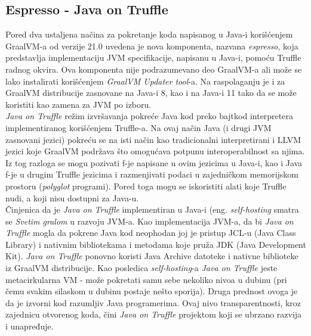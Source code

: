 \documentclass[a4paper]{article}
\begin{document}
\subsection{Espresso - Java on Truffle}
\label{sub:Espresso - Java on Truffle}

Pored dva ustaljena načina za pokretanje koda napisanog u Java-i korišćenjem GraalVM-a od verzije 21.0 uvedena je nova komponenta, nazvana \emph{espresso}, koja predstavlja implementaciju JVM specifikacije, napisanu u Java-i, pomoću Truffle radnog okvira. Ova komponenta nije podrazumevano deo GraalVM-a ali može se lako instalirati korišćenjem \emph{GraalVM Updater tool}-a. Na raspolaganju je i za GraalVM distribucije zasnovane na Java-i 8, kao i na Java-i 11 tako da se može koristiti kao zamena za JVM po izboru. \\


\emph{Java on Truffle} režim izvršavanja pokreće Java kod preko bajtkod interpretera implementiranog korišćenjem Truffle-a. Na ovaj način Java (i drugi JVM zasnovani jezici) pokreću se na isti način kao tradicionalni interpretirani i LLVM jezici koje GraalVM podržava što omogućava potpunu interoperabilnost sa njima. Iz tog razloga se mogu pozivati f-je napisane u ovim jezicima u Java-i, kao i Java f-je u drugim Truffle jezicima i razmenjivati podaci u zajedničkom memorijskom prostoru (\emph{polyglot} programi). Pored toga mogu se iskoristiti alati koje Truffle nudi, a koji nisu dostupni za Java-u. \\

Činjenica da je \emph{Java on Truffle} implementiran u Java-i (eng. \emph{self-hosting} smatra se \emph{Svetim gralom} u razvoju JVM-a. Kao implementacija JVM-a, da bi \emph{Java on Truffle} mogla da pokrene Java kod neophodan joj je pristup JCL-u (Java Class Library) i nativnim bibliotekama i metodama koje pruža JDK (Java Development Kit). \emph{Java on Truffle} ponovno koristi Java Archive datoteke i nativne biblioteke iz GraalVM distribucije. Kao posledica \emph{self-hosting}-a \emph{Java on Truffle} jeste metacirkularna VM - može pokretati samu sebe nekoliko nivoa u dubinu (pri čemu svakim silaskom u dubinu postaje nešto sporija). Druga prednost ovoga je da je izvorni kod razumljiv Java programerima. Ovaj nivo transparentnosti, kroz zajednicu otvorenog koda, čini \emph{Java on Truffle} projektom koji se ubrzano razvija i unapređuje. \\
\end{document}
